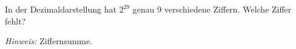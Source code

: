 
\begin{exercise}

In der Dezimaldarstellung hat $2^29$ genau 9 verschiedene Ziffern.
Welche Ziffer fehlt? 

\textit{Hinweis:} Ziffernsumme.

\end{exercise}


\begin{solution}

\phantom{}

\end{solution}

